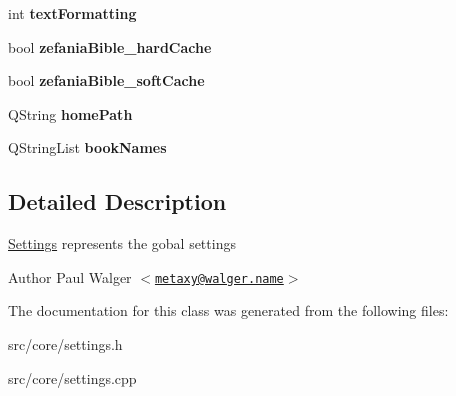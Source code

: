 \begin{DoxyCompactItemize}
\item 
\hypertarget{classSettings_a8ab9cbd065e446b65f9fbb4ce6f981a7}{
int {\bfseries textFormatting}}
\label{classSettings_a8ab9cbd065e446b65f9fbb4ce6f981a7}

\item 
\hypertarget{classSettings_a28f6c1d7cdf32e63ee846d0a837e5cb6}{
bool {\bfseries zefaniaBible\_\-hardCache}}
\label{classSettings_a28f6c1d7cdf32e63ee846d0a837e5cb6}

\item 
\hypertarget{classSettings_aef510dadba5c3c966cff5d5175c47e7f}{
bool {\bfseries zefaniaBible\_\-softCache}}
\label{classSettings_aef510dadba5c3c966cff5d5175c47e7f}

\item 
\hypertarget{classSettings_a28469cd69cee24a26821011fa375508b}{
QString {\bfseries homePath}}
\label{classSettings_a28469cd69cee24a26821011fa375508b}

\item 
\hypertarget{classSettings_ab062343977a2a1ca8c42e48aee4b6948}{
QStringList {\bfseries bookNames}}
\label{classSettings_ab062343977a2a1ca8c42e48aee4b6948}

\end{DoxyCompactItemize}


\subsection{Detailed Description}
\hyperlink{classSettings}{Settings} represents the gobal settings

\begin{DoxyAuthor}{Author}
Paul Walger $<$\href{mailto:metaxy@walger.name}{\tt metaxy@walger.name}$>$ 
\end{DoxyAuthor}


The documentation for this class was generated from the following files:\begin{DoxyCompactItemize}
\item 
src/core/settings.h\item 
src/core/settings.cpp\end{DoxyCompactItemize}
